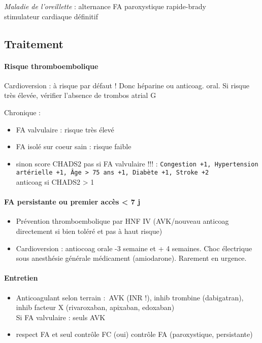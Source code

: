\textit{Maladie de l'oreillette}  : alternance FA paroxystique rapide-brady\\
\thus stimulateur cardiaque définitif

\subsection{Traitement}
\paragraph{Risque thromboembolique}
Cardioversion : à risque par défaut ! Donc héparine ou anticoag. oral. 
Si risque très élevée, vérifier l'absence de trombos atrial G

Chronique :
\begin{itemize}
  \item FA valvulaire : risque très élevé
  \item FA isolé sur coeur sain : risque faible
  \item sinon score CHADS2 \danger{} pas si FA valvulaire !!! : \texttt{Congestion +1,
    Hypertension artérielle +1, Âge > 75 ans +1, Diabète +1, Stroke +2}\\
    anticoag si CHADS2 > 1
\end{itemize}

\paragraph{FA persistante ou premier accès < 7 j}
\begin{itemize}
  \item Prévention thromboembolique par HNF IV (AVK/nouveau anticoag
    directement si bien toléré et pas à haut risque)
  \item Cardioversion : antiocoag orale -3 semaine et + 4 semaines. Choc
    électrique sous anesthésie générale \lor{} médicament (amiodarone). Rarement en
    urgence.
\end{itemize}

\paragraph{Entretien}
\begin{itemize}
  \item Anticoagulant selon terrain : AVK (INR !), inhib trombine (dabigatran), inhib
facteur X (rivaroxaban, apixaban, edoxaban)\\
Si FA valvulaire : seuls AVK
\item respect FA et seul contrôle FC (oui) \lor{} contrôle FA (paroxystique,
  persistante)
\end{itemize}

